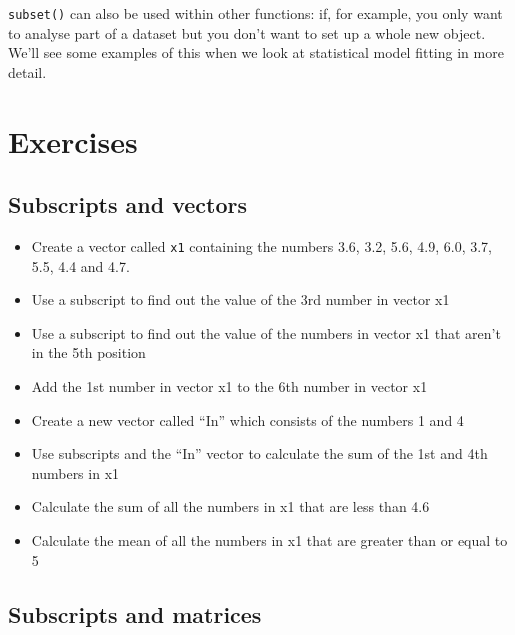 \documentclass[
]{book}
\begin{document}
\texttt{subset()} can also be used within other functions: if, for example, you only want to analyse part of a dataset but you don't want to set up a whole new object. We'll see some examples of this when we look at statistical model fitting in more detail.

\hypertarget{exercises-2}{%
\section{Exercises}\label{exercises-2}}

\hypertarget{subscripts-and-vectors}{%
\subsection{Subscripts and vectors}\label{subscripts-and-vectors}}

\begin{itemize}
\item
  Create a vector called \texttt{x1} containing the numbers 3.6, 3.2, 5.6, 4.9, 6.0, 3.7, 5.5, 4.4 and 4.7.
\item
  Use a subscript to find out the value of the 3rd number in vector x1
\item
  Use a subscript to find out the value of the numbers in vector x1 that aren't in the 5th position
\item
  Add the 1st number in vector x1 to the 6th number in vector x1
\item
  Create a new vector called ``In'' which consists of the numbers 1 and 4
\item
  Use subscripts and the ``In'' vector to calculate the sum of the 1st and 4th numbers in x1
\item
  Calculate the sum of all the numbers in x1 that are less than 4.6
\item
  Calculate the mean of all the numbers in x1 that are greater than or equal to 5
\end{itemize}

\hypertarget{subscripts-and-matrices}{%
\subsection{Subscripts and matrices}\label{subscripts-and-matrices}}
\end{document}
